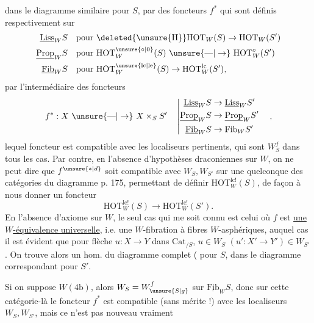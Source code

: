 dans le diagramme similaire pour $S$, par des foncteurs $f^*$ qui sont définis respectivement sur
\[
\begin{aligned}
\underline{\mathrm{Liss}}_W S&\quad\text{pour }\deleted{\unsure{\mathrm{H}}}\mathrm{HOT}_W(S)\to\mathrm{HOT}_W(S')\\
\underline{\mathrm{Prop}}_W S&\quad\text{pour }\mathrm{HOT}_W^{\unsure{\circ|0}}(S)\ \unsure{\text{---}|\to}\ \mathrm{HOT}_W^\circ(S')\\
\underline{\mathrm{Fib}}_W S&\quad\text{pour }\mathrm{HOT}_W^{\unsure{\mathrm{lc}|\mathrm{le}}}(S)\to\mathrm{HOT}_W^{\mathrm{lc}}(S'),
\end{aligned}
\]
par l'intermédiaire des foncteurs
\[
f^*:X\ \unsure{\text{---}|\to}\ X\times_S S'\quad
\left|\begin{aligned}
\underline{\mathrm{Liss}}_W S&\to\underline{\mathrm{Liss}}_W S'\\
\underline{\mathrm{Prop}}_W S&\to\underline{\mathrm{Prop}}_W S'\\
\underline{\mathrm{Fib}}_W S&\to\mathrm{Fib}_W S'
\end{aligned}\right.\quad,
\]
lequel foncteur est compatible avec les localiseurs pertinents, qui sont $W_S^f$ dans tous les cas. Par contre, en l'absence d'hypothèses draconiennes sur $W$,  on ne peut dire que $f^{\unsure{*|d}}$ soit compatible avec $W_S,W_{S'}$ sur une quelconque des catégories du diagramme p. 175, permettant de définir  $\mathrm{HOT}_W^{\mathrm{lc}!}(S)$, de façon à nous donner un foncteur
\[
\mathrm{HOT}_W^{\mathrm{lc}!}(S)\longrightarrow\mathrm{HOT}_W^{\mathrm{lc}!}(S').
\]
En l'absence d'axiome sur $W$, le seul cas qui me soit connu est celui où $f$ est \uline{une $W$-équivalence universelle}, i.e. une $W$-fibration à fibres $W$-asphériques, auquel cas il est
évident que pour  flèche  $u:X\to Y$ dans $\mathrm{Cat}_{/S}$, $u\in W_S$  $(u':X'\to Y')\in W_{S'}$. On trouve alors un hom. du diagramme complet (   pour $S$, dans le diagramme correspondant pour $S'$.

Si on suppose $W(4\mathrm b)$, alors $W_S=W_{\unsure{S|g}}^f$ sur $\underline{\mathrm{Fib}}_W S$, donc sur cette catégorie-là le foncteur $f^*$ est compatible (sans mérite !) avec les localiseurs $W_S,W_{S'}$, mais ce n'est pas nouveau vraiment

